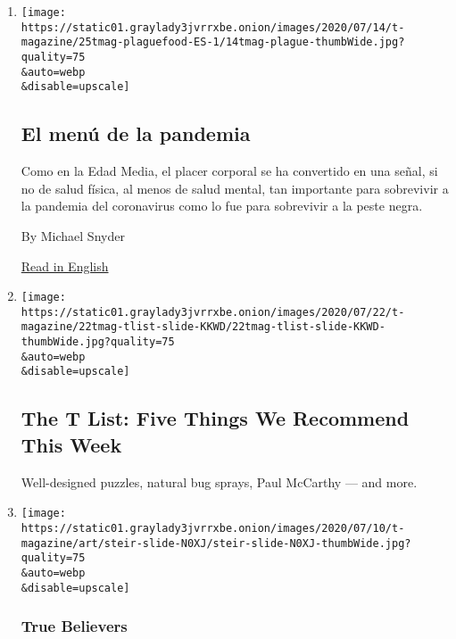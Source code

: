 \begin{enumerate}
\def\labelenumi{\arabic{enumi}.}
\item
  \href{/es/2020/07/23/t-magazine/comida-pandemia.html}{}

  \texttt{[image: https://static01.graylady3jvrrxbe.onion/images/2020/07/14/t-magazine/25tmag-plaguefood-ES-1/14tmag-plague-thumbWide.jpg?quality=75\\\&auto=webp\\\&disable=upscale]}

  \hypertarget{el-menuxfa-de-la-pandemia}{%
  \subsection{El menú de la pandemia}\label{el-menuxfa-de-la-pandemia}}

  Como en la Edad Media, el placer corporal se ha convertido en una
  señal, si no de salud física, al menos de salud mental, tan importante
  para sobrevivir a la pandemia del coronavirus como lo fue para
  sobrevivir a la peste negra.

  By Michael Snyder

  \href{https://www.nytimes3xbfgragh.onion/2020/07/16/t-magazine/eating-food-during-plague.html}{Read
  in English}
\item
  \href{/2020/07/23/t-magazine/puzzles-bug-spray-tlist.html}{}

  \texttt{[image: https://static01.graylady3jvrrxbe.onion/images/2020/07/22/t-magazine/22tmag-tlist-slide-KKWD/22tmag-tlist-slide-KKWD-thumbWide.jpg?quality=75\\\&auto=webp\\\&disable=upscale]}

  \hypertarget{the-t-list-five-things-we-recommend-this-week-1}{%
  \subsection{The T List: Five Things We Recommend This
  Week}\label{the-t-list-five-things-we-recommend-this-week-1}}

  Well-designed puzzles, natural bug sprays, Paul McCarthy --- and more.
\item
  \href{/2020/07/21/t-magazine/pat-steir.html}{}

  \texttt{[image: https://static01.graylady3jvrrxbe.onion/images/2020/07/10/t-magazine/art/steir-slide-N0XJ/steir-slide-N0XJ-thumbWide.jpg?quality=75\\\&auto=webp\\\&disable=upscale]}

  \hypertarget{true-believers-8}{%
  \subsubsection{True Believers}\label{true-believers-8}}


\end{enumerate}
